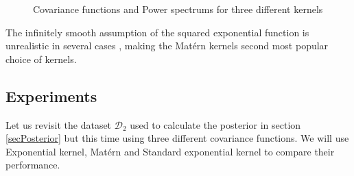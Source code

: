 \begin{figure}[!ht]
  \centering
    \quad
{}\quad
\caption{Covariance functions and Power spectrums for three different kernels}
       \label{figKernelAndPowerSpectrums}
\end{figure}

The infinitely smooth assumption of the squared exponential function is unrealistic in several cases \cite{stein2012interpolation}, making the Mat\'ern kernels second most popular choice of kernels. 

\subsection{Experiments}
Let us revisit the dataset $\mathcal{D}_{2}$ used to calculate the posterior in section \ref{secPosterior} but this time using three different covariance functions. We will use Exponential kernel, Mat\'ern and Standard exponential kernel to compare their performance. 

